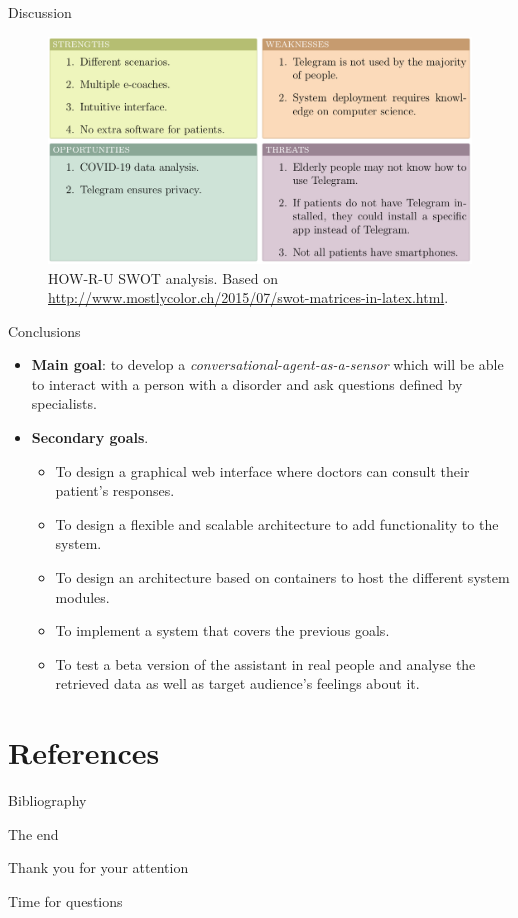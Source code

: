 \documentclass{beamer}
\newcommand{\greentick}{\textcolor{green}{\ding{52}}}
\newcommand{\redcross}{\textcolor{red}{\ding{55}}}
\begin{document}
\begin{frame}[fragile]{Discussion}
  \begin{figure}[H]
    \centering
    \includegraphics[width=\textwidth]{swot.png}
    \caption{HOW-R-U SWOT analysis. Based on \href{http://www.mostlycolor.ch/2015/07/swot-matrices-in-latex.html}{http://www.mostlycolor.ch/2015/07/swot-matrices-in-latex.html}.}
  \end{figure}
\end{frame}

\begin{frame}[fragile]{Conclusions}
  \begin{itemize}[<+->]
    \item \textbf{Main goal}: to develop a \emph{conversational-agent-as-a-sensor} which will be able to interact with a person with a disorder and ask questions defined by specialists. \uncover<2-8>{\greentick}
    \item \textbf{Secondary goals}.
      \begin{itemize}[<+->]
        \item To design a graphical web interface where doctors can consult their patient's responses. \uncover<4-8>{\greentick}
        \item To design a flexible and scalable architecture to add functionality to the system. \uncover<5-8>{\greentick}
        \item To design an architecture based on containers to host the different system modules. \uncover<6-8>{\greentick}
        \item To implement a system that covers the previous goals. \uncover<7-8>{\greentick}
        \item To test a beta version of the assistant in real people and analyse the retrieved data as well as target audience's feelings about it. \uncover<8>{\redcross}
      \end{itemize}
  \end{itemize}
\end{frame}

\section*{References}

\begin{frame}[allowframebreaks]{Bibliography}


\end{frame}

\begin{frame}{The end}
\begin{center}
  \Huge
  Thank you for your attention
\end{center}
\begin{center}
  \large
  Time for questions
\end{center}
\end{frame}
\end{document}
